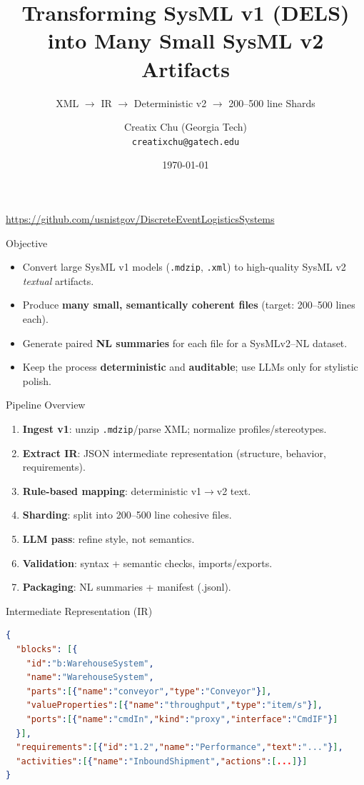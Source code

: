 \documentclass[aspectratio=169]{beamer}
\title{Transforming SysML v1 (DELS) into Many Small SysML v2 Artifacts}
\subtitle{XML $\rightarrow$ IR $\rightarrow$ Deterministic v2 $\rightarrow$ 200--500 line Shards}
\author{Creatix Chu (Georgia Tech) \\ \texttt{creatixchu@gatech.edu}}
\date{\today}
\begin{document}
\begin{frame}
  \titlepage
  \vspace{1em}
  \centering
  \footnotesize
  \url{https://github.com/usnistgov/DiscreteEventLogisticsSystems}
\end{frame}

\begin{frame}{Objective}
\begin{itemize}
  \item Convert large SysML v1 models (\texttt{.mdzip}, \texttt{.xml}) to high-quality SysML v2 \emph{textual} artifacts.
  \item Produce \textbf{many small, semantically coherent files} (target: 200--500 lines each).
  \item Generate paired \textbf{NL summaries} for each file for a SysMLv2--NL dataset.
  \item Keep the process \textbf{deterministic} and \textbf{auditable}; use LLMs only for stylistic polish.
\end{itemize}
\end{frame}

\begin{frame}{Pipeline Overview}
\begin{enumerate}
  \item \textbf{Ingest v1}: unzip \texttt{.mdzip}/parse XML; normalize profiles/stereotypes.
  \item \textbf{Extract IR}: JSON intermediate representation (structure, behavior, requirements).
  \item \textbf{Rule-based mapping}: deterministic v1$\rightarrow$v2 text.
  \item \textbf{Sharding}: split into 200–500 line cohesive files.
  \item \textbf{LLM pass}: refine style, not semantics.
  \item \textbf{Validation}: syntax + semantic checks, imports/exports.
  \item \textbf{Packaging}: NL summaries + manifest (.jsonl).
\end{enumerate}
\end{frame}

\begin{frame}[fragile]{Intermediate Representation (IR)}
\small
\begin{lstlisting}[style=code,language=json]
{
  "blocks": [{
    "id":"b:WarehouseSystem",
    "name":"WarehouseSystem",
    "parts":[{"name":"conveyor","type":"Conveyor"}],
    "valueProperties":[{"name":"throughput","type":"item/s"}],
    "ports":[{"name":"cmdIn","kind":"proxy","interface":"CmdIF"}]
  }],
  "requirements":[{"id":"1.2","name":"Performance","text":"..."}],
  "activities":[{"name":"InboundShipment","actions":[...]}]
}
\end{lstlisting}
\normalsize
\end{frame}
\end{document}
